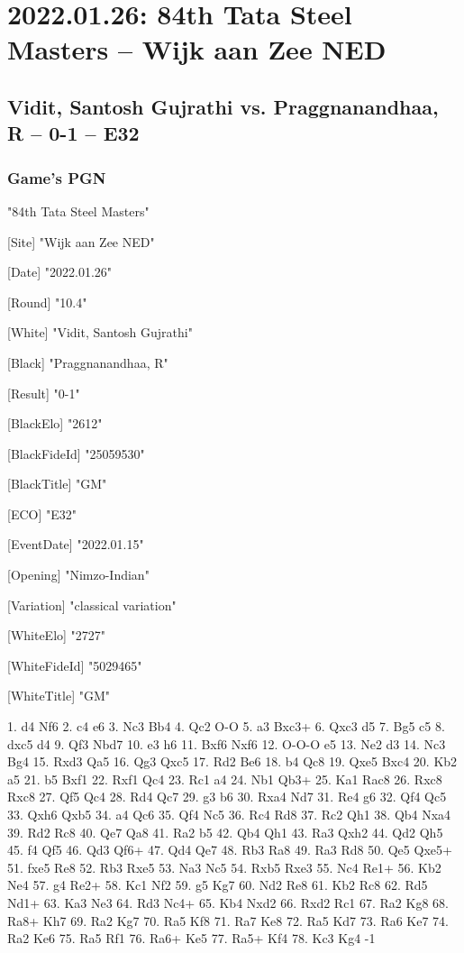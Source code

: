 \documentclass[9pt]{extarticle}
\begin{document}
\section*{2022.01.26: 84th Tata Steel Masters -- Wijk aan Zee NED}

\subsection*{Vidit, Santosh Gujrathi vs. Praggnanandhaa, R -- 0-1 -- E32}
\subsubsection*{Game's PGN}
\begin{flushleft}
[Event] "84th Tata Steel Masters"

[Site] "Wijk aan Zee NED"

[Date] "2022.01.26"

[Round] "10.4"

[White] "Vidit, Santosh Gujrathi"

[Black] "Praggnanandhaa, R"

[Result] "0-1"

[BlackElo] "2612"

[BlackFideId] "25059530"

[BlackTitle] "GM"

[ECO] "E32"

[EventDate] "2022.01.15"

[Opening] "Nimzo-Indian"

[Variation] "classical variation"

[WhiteElo] "2727"

[WhiteFideId] "5029465"

[WhiteTitle] "GM"

\end{flushleft}
\begin{flushleft}
1. d4 Nf6 2. c4 e6 3. Nc3 Bb4 4. Qc2 O-O 5. a3 Bxc3+ 6. Qxc3 d5 7. Bg5 c5 8. dxc5 d4 9. Qf3 Nbd7 10. e3 h6 11. Bxf6 Nxf6 12. O-O-O e5 13. Ne2 d3 14. Nc3 Bg4 15. Rxd3 Qa5 16. Qg3 Qxc5 17. Rd2 Be6 18. b4 Qc8 19. Qxe5 Bxc4 20. Kb2 a5 21. b5 Bxf1 22. Rxf1 Qc4 23. Rc1 a4 24. Nb1 Qb3+ 25. Ka1 Rac8 26. Rxc8 Rxc8 27. Qf5 Qc4 28. Rd4 Qc7 29. g3 b6 30. Rxa4 Nd7 31. Re4 g6 32. Qf4 Qc5 33. Qxh6 Qxb5 34. a4 Qc6 35. Qf4 Nc5 36. Rc4 Rd8 37. Rc2 Qh1 38. Qb4 Nxa4 39. Rd2 Rc8 40. Qe7 Qa8 41. Ra2 b5 42. Qb4 Qh1 43. Ra3 Qxh2 44. Qd2 Qh5 45. f4 Qf5 46. Qd3 Qf6+ 47. Qd4 Qe7 48. Rb3 Ra8 49. Ra3 Rd8 50. Qe5 Qxe5+ 51. fxe5 Re8 52. Rb3 Rxe5 53. Na3 Nc5 54. Rxb5 Rxe3 55. Nc4 Re1+ 56. Kb2 Ne4 57. g4 Re2+ 58. Kc1 Nf2 59. g5 Kg7 60. Nd2 Re8 61. Kb2 Rc8 62. Rd5 Nd1+ 63. Ka3 Ne3 64. Rd3 Nc4+ 65. Kb4 Nxd2 66. Rxd2 Rc1 67. Ra2 Kg8 68. Ra8+ Kh7 69. Ra2 Kg7 70. Ra5 Kf8 71. Ra7 Ke8 72. Ra5 Kd7 73. Ra6 Ke7 74. Ra2 Ke6 75. Ra5 Rf1 76. Ra6+ Ke5 77. Ra5+ Kf4 78. Kc3 Kg4 \quad  {}-1
\end{flushleft}
\end{document}
